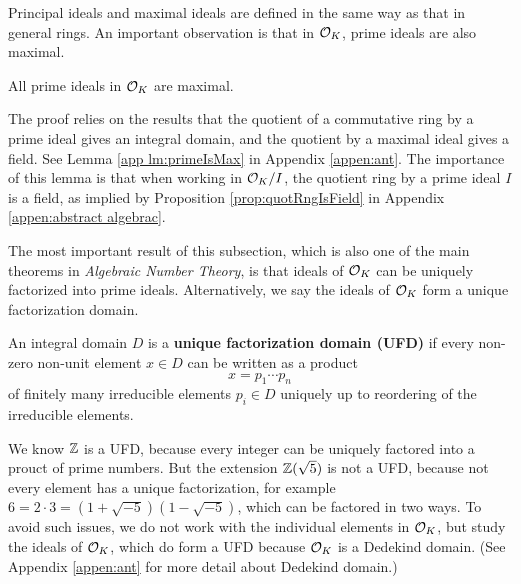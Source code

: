 \documentclass[../main.tex]{subfiles}
\begin{document}
Principal ideals and maximal ideals are defined in the same way as that in general rings. An important observation is that in $\mathcal{O}_K$, prime ideals are also maximal. 

\begin{lemma}
All prime ideals in $\mathcal{O}_K$ are maximal. 
\end{lemma}
The proof relies on the results that the quotient of a commutative ring by a prime ideal gives an integral domain, and the quotient by a maximal ideal gives a field. See Lemma \ref{app lm:primeIsMax} in Appendix \ref{appen:ant}.
The importance of this lemma is that when working in $\mathcal{O}_K/I$, the quotient ring by a prime ideal $I$ is a field, as implied by Proposition \ref{prop:quotRngIsField} in Appendix \ref{appen:abstract algebrac}.

The most important result of this subsection, which is also one of the main theorems in \textit{Algebraic Number Theory}, is that ideals of $\mathcal{O}_K$ can be uniquely factorized into prime ideals. Alternatively, we say the ideals of $\mathcal{O}_K$ form a unique factorization domain.

\begin{definition}
An integral domain $D$ is a 
\textbf{unique factorization domain (UFD)} if every non-zero non-unit element $x \in D$ can be written as a product 
\begin{equation*}
    x= p_1 \cdots p_n
\end{equation*}
of finitely many irreducible elements $p_i \in D$ uniquely up to reordering of the irreducible elements.
\end{definition}

We know $\mathbb{Z}$ is a UFD, because every integer can be uniquely factored into a prouct of prime numbers. But the extension $\mathbb{Z}(\sqrt{5})$ is not a UFD, because not every element has a unique factorization, for example $6=2 \cdot 3 = (1+\sqrt{-5})(1-\sqrt{-5})$, which can be factored in two ways. 
To avoid such issues, 
we do not work with the individual elements in $\mathcal{O}_K$, but study the ideals of $\mathcal{O}_K$, which do form a UFD because $\mathcal{O}_K$ is a Dedekind domain. 
(See Appendix \ref{appen:ant} for more detail about Dedekind domain.) 
\end{document}
